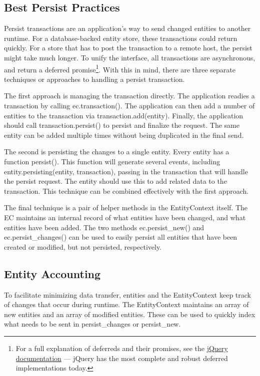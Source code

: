 \documentclass{article}
\begin{document}
\subsection{Best Persist Practices}

Persist transactions are an application's way to send changed entities to
another runtime. For a database-backed entity store, these transactions could
return quickly. For a store that has to post the transaction to a remote host,
the persist might take much longer. To unify the interface, all transactions are
asynchronous, and return a deferred promise\footnote{For a full explanation of
deferreds and their promises, see the
\href{http://api.jquery.com/category/deferred-object}{jQuery documentation}
--- jQuery has the most complete and
robust deferred implementations today.}. With this in mind, there are three
separate techniques or approaches to handling a persist transaction.

The first approach is managing the transaction directly. The application readies
a transaction by calling {\ilcode ec.transaction()}. The application can then
add a number of entities to the transaction via {\ilcode
transaction.add(entity)}. Finally, the application should call {\ilcode
transaction.persist()} to persist and finalize the request. The same entity can
be added multiple times without being duplicated in the final send.

The second is persisting the changes to a single entity. Every entity has a
function {\ilcode persist()}. This function will generate several events,
including {\ilcode entity.persisting(entity, transaction)}, passing in the
transaction that will handle the persist request. The entity should use this to
add related data to the transaction. This technique can be combined effectively
with the first approach.

The final technique is a pair of helper methods in the EntityContext itself. The
EC maintains an internal record of what entities have been changed, and what
entities have been added. The two methods {\ilcode ec.persist\_new()} and
{\ilcode ec.persist\_changes()} can be used to easily persist all entities that
have been created or modified, but not persisted, respectively.

\subsection{Entity Accounting}

To facilitate minimizing data transfer, entities and the EntityContext keep
track of changes that occur during runtime. The EntityContext maintains an array
of new entities and an array of modified entities. These can be used to quickly
index what needs to be sent in {\ilcode persist\_changes} or {\ilcode
persist\_new}.
\end{document}
